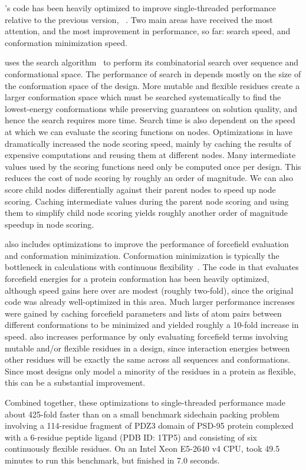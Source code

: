 's code has been heavily optimized to improve single-threaded performance relative to the previous version, ~\cite{COMETS}. Two main areas have received the most attention, and the most improvement in performance, so far: \as search speed, and conformation minimization speed.

\osprey uses the \as search algorithm~\cite{DEE/A*} to perform its combinatorial search over sequence and conformational space.  The performance of \as search in \osprey depends mostly on the size of the conformation space of the design. More mutable and flexible residues create a larger conformation space which must be searched systematically to find the lowest-energy conformations while preserving guarantees on solution quality, and hence the search requires more time. Search time is also dependent on the speed at which we can evaluate the scoring functions on \as nodes. Optimizations in  have dramatically increased the \as node scoring speed, mainly by caching the results of expensive computations and reusing them at different nodes. Many intermediate values used by the \as scoring functions need only be computed once per design. This reduces the cost of node scoring by roughly an order of magnitude. We can also score child nodes differentially against their parent nodes to speed up node scoring. Caching intermediate values during the parent node scoring and using them to simplify child node scoring yields roughly another order of magnitude speedup in \as node scoring. %

 also includes optimizations to improve the performance of forcefield evaluation and conformation minimization. Conformation minimization is typically the bottleneck in \osprey calculations with continuous flexibility~\cite{minDEE,iMinDEE,DEEPer,CATS}.  The code in  that evaluates forcefield energies for a protein conformation has been heavily optimized, although speed gains here over  are modest (roughly two-fold), since the original code was already well-optimized in this area. Much larger performance increases were gained by caching forcefield parameters and lists of atom pairs between different conformations to be minimized and yielded roughly a 10-fold increase in speed.  also increases performance by only evaluating forcefield terms involving mutable and/or flexible residues in a design, since interaction energies between other residues will be exactly the same across all sequences and conformations.  Since most designs only model a minority of the residues in a protein as flexible, this can be a substantial improvement. 

Combined together, these optimizations to single-threaded performance made  about 425-fold faster than  on a small benchmark sidechain packing problem involving a 114-residue fragment of PDZ3 domain of PSD-95 protein complexed with a 6-residue peptide ligand (PDB ID: 1TP5) and consisting of six continuously flexible residues.  On an Intel Xeon E5-2640 v4 CPU,  took 49.5 minutes to run this benchmark, but  finished in 7.0 seconds.  
